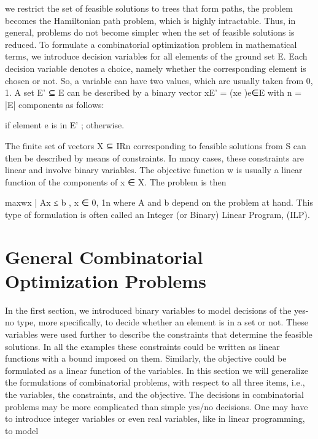 \documentclass[titlepage]{book}
\begin{document}
we restrict the set of feasible solutions to trees that form paths, the problem becomes the Hamiltonian
path problem, which is highly intractable. Thus, in general, problems do not become simpler when the
set of feasible solutions is reduced.
To formulate a combinatorial optimization problem in mathematical terms, we introduce decision variables for all elements of the ground set E. Each decision variable denotes a choice, namely whether the
corresponding element is chosen or not. So, a variable can have two values, which are usually taken from
{0, 1}. A set E' ⊆ E can be described by a binary vector xE' = (xe )e∈E with n = |E| components as
follows:


if element e is in E' ;
otherwise.

The finite set of vectors X ⊆ IRn corresponding to feasible solutions from S can then be described by
means of constraints. In many cases, these constraints are linear and involve binary variables. The
objective function w is usually a linear function of the components of x ∈ X. The problem is then

max{wx | Ax ≤ b , x ∈ {0, 1}n }
where A and b depend on the problem at hand. This type of formulation is often called an Integer (or
Binary) Linear Program, (ILP).

\section{General Combinatorial Optimization Problems}

In the first section, we introduced binary variables to model decisions of the yes-no type, more specifically,
to decide whether an element is in a set or not. These variables were used further to describe the
constraints that determine the feasible solutions. In all the examples these constraints could be written
as linear functions with a bound imposed on them. Similarly, the objective could be formulated as a linear
function of the variables. In this section we will generalize the formulations of combinatorial problems,
with respect to all three items, i.e., the variables, the constraints, and the objective.
The decisions in combinatorial problems may be more complicated than simple yes/no decisions. One
may have to introduce integer variables or even real variables, like in linear programming, to model
\end{document}

